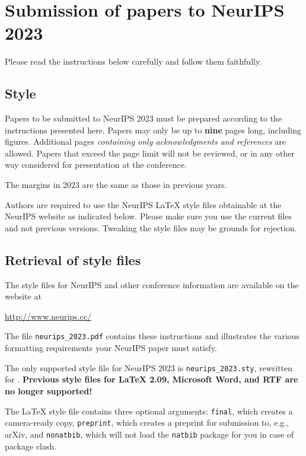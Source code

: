\documentclass{article}
\begin{document}
\section{Submission of papers to NeurIPS 2023}


Please read the instructions below carefully and follow them faithfully.


\subsection{Style}


Papers to be submitted to NeurIPS 2023 must be prepared according to the
instructions presented here. Papers may only be up to {\bf nine} pages long,
including figures. Additional pages \emph{containing only acknowledgments and
references} are allowed. Papers that exceed the page limit will not be
reviewed, or in any other way considered for presentation at the conference.


The margins in 2023 are the same as those in previous years.


Authors are required to use the NeurIPS \LaTeX{} style files obtainable at the
NeurIPS website as indicated below. Please make sure you use the current files
and not previous versions. Tweaking the style files may be grounds for
rejection.


\subsection{Retrieval of style files}


The style files for NeurIPS and other conference information are available on
the website at
\begin{center}
  \url{http://www.neurips.cc/}
\end{center}
The file \verb+neurips_2023.pdf+ contains these instructions and illustrates the
various formatting requirements your NeurIPS paper must satisfy.


The only supported style file for NeurIPS 2023 is \verb+neurips_2023.sty+,
rewritten for \LaTeXe{}.  \textbf{Previous style files for \LaTeX{} 2.09,
  Microsoft Word, and RTF are no longer supported!}


The \LaTeX{} style file contains three optional arguments: \verb+final+, which
creates a camera-ready copy, \verb+preprint+, which creates a preprint for
submission to, e.g., arXiv, and \verb+nonatbib+, which will not load the
\verb+natbib+ package for you in case of package clash.
\end{document}
